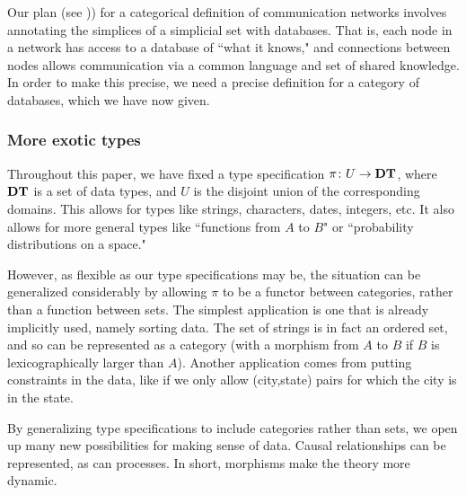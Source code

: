 \documentclass{amsart}
\begin{document}
Our plan (see \cite{Spi2})) for a categorical definition of communication networks involves annotating the simplices of a simplicial set with databases.  That is, each node in a network has access to a database of ``what it knows," and connections between nodes allows communication via a common language and set of shared knowledge.  In order to make this precise, we need a precise definition for a category of databases, which we have now given.  

\subsubsection{More exotic types}\label{subsubsec:types}

Throughout this paper, we have fixed a type specification $\pi\colon U\rightarrow{\bf DT}$, where ${\bf DT}$ is a set of data types, and $U$ is the disjoint union of the corresponding domains.  This allows for types like strings, characters, dates, integers, etc.  It also allows for more general types like ``functions from $A$ to $B$" or ``probability distributions on a space."  

However, as flexible as our type specifications may be, the situation can be generalized considerably by allowing $\pi$ to be a functor between categories, rather than a function between sets.  The simplest application is one that is already implicitly used, namely sorting data.  The set of strings is in fact an ordered set, and so can be represented as a category (with a morphism from $A$ to $B$ if $B$ is lexicographically larger than $A$).  Another application comes from putting constraints in the data, like if we only allow (city,state) pairs for which the city is in the state. 

By generalizing type specifications to include categories rather than sets, we open up many new possibilities for making sense of data.  Causal relationships can be represented, as can processes.  In short, morphisms make the theory more dynamic.  




\end{document}
